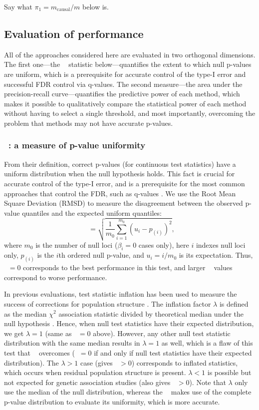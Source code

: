 \documentclass[12pt]{article}
\DeclareMathOperator{\rmsd}{\text{RMSD}_p}
\begin{document}
Say what $\pi_1 = m_\text{causal} / m$ below is.

\subsection{Evaluation of performance}

All of the approaches considered here are evaluated in two orthogonal dimensions.
The first one---the $\rmsd$ statistic below---quantifies the extent to which null p-values are uniform, which is a prerequisite for accurate control of the type-I error and successful FDR control via q-values.
The second measure---the area under the precision-recall curve---quantifies the predictive power of each method, which makes it possible to qualitatively compare the statistical power of each method without having to select a single threshold, and most importantly, overcoming the problem that methods may not have accurate p-values.

\subsubsection{$\rmsd$: a measure of p-value uniformity}

From their definition, correct p-values (for continuous test statistics) have a uniform distribution when the null hypothesis holds.
This fact is crucial for accurate control of the type-I error, and is a prerequisite for the most common approaches that control the FDR, such as q-values \citep{storey_positive_2003, storey_statistical_2003}.
We use the Root Mean Square Deviation (RMSD) to measure the disagreement between the observed p-value quantiles and the expected uniform quantiles:
$$
\rmsd
=
\sqrt{ \frac{1}{m_0} \sum_{i = 1}^{m_0} \left( u_i - p_{(i)} \right)^2 },
$$
where
$m_0$ is the number of null loci ($\beta_i = 0$ cases only),
here $i$ indexes null loci only,
$p_{(i)}$ is the $i$th ordered null p-value, and
$u_i = i / m_0$ is its expectation.
Thus, $\rmsd = 0$ corresponds to the best performance in this test, and larger $\rmsd$ values correspond to worse performance.

In previous evaluations, test statistic inflation has been used to measure the success of corrections for population structure \citep{astle_population_2009}.
The inflation factor $\lambda$ is defined as the median $\chi^2$ association statistic divided by theoretical median under the null hypothesis \citep{devlin_genomic_1999}.
Hence, when null test statistics have their expected distribution, we get $\lambda = 1$ (same as $\rmsd = 0$ above).
However, any other null test statistic distribution with the same median results in $\lambda = 1$ as well, which is a flaw of this test that $\rmsd$ overcomes ($\rmsd = 0$ if and only if null test statistics have their expected distribution).
The $\lambda > 1$ case (gives $\rmsd > 0$) corresponds to inflated statistics, which occurs when residual population structure is present.
$\lambda < 1$ is possible but not expected for genetic association studies (also gives $\rmsd > 0$).
Note that $\lambda$ only use the median of the null distribution, whereas the $\rmsd$ makes use of the complete p-value distribution to evaluate its uniformity, which is more accurate.
\end{document}
